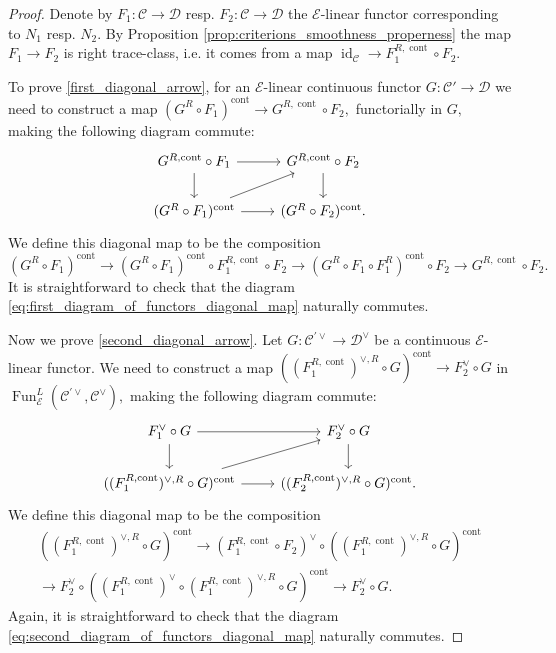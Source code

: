 \documentclass[11pt,leqno]{amsart}
\numberwithin{equation}{section}
\newcommand{\cont}{\operatorname{cont}}
\newcommand{\cD}{{\mathcal D}}
\newcommand{\cC}{{\mathcal C}}
\newcommand{\cE}{{\mathcal E}}
\newcommand{\Fun}{\operatorname{Fun}}
\newcommand{\id}{\operatorname{id}}
\begin{document}
\begin{proof} 
Denote by $F_1:\cC\to\cD$ resp. $F_2:\cC\to\cD$ the $\cE$-linear functor corresponding to $N_1$ resp. $N_2.$ By Proposition \ref{prop:criterions_smoothness_properness} the map $F_1\to F_2$ is right trace-class, i.e. it comes from a map $\id_{\cC}\to F_1^{R,\cont}\circ F_2$. 

To prove \ref{first_diagonal_arrow}, for an $\cE$-linear continuous functor $G:\cC'\to\cD$ we need to construct a map $(G^R\circ F_1)^{\cont}\to G^{R,\cont}\circ F_2,$ functorially in $G,$ making the following diagram commute:
\begin{equation}\label{eq:first_diagram_of_functors_diagonal_map}
\begin{tikzcd}
G^{R,\cont}\circ F_1\ar[d]\ar[r] & G^{R,\cont}\circ F_2 \ar[d]\\
(G^R\circ F_1)^{\cont}\ar[r]\ar[ru] & (G^R\circ F_2)^{\cont}.
\end{tikzcd}	
\end{equation}
We define this diagonal map to be the composition
\begin{equation*}
(G^R\circ F_1)^{\cont}\to (G^R\circ F_1)^{\cont}\circ F_1^{R,\cont}\circ F_2\to (G^R\circ F_1\circ F_1^R)^{\cont}\circ F_2\to G^{R,\cont}\circ F_2.
\end{equation*}
It is straightforward to check that the diagram \eqref{eq:first_diagram_of_functors_diagonal_map} naturally commutes.

Now we prove \ref{second_diagonal_arrow}. Let $G:\cC^{'\vee}\to\cD^{\vee}$ be a continuous $\cE$-linear functor. We need to construct a map $((F_1^{R,\cont})^{\vee,R}\circ G)^{\cont}\to F_2^{\vee}\circ G$ in $\Fun_{\cE}^L(\cC^{'\vee},\cC^{\vee}),$ making the following diagram commute: 
\begin{equation}\label{eq:second_diagram_of_functors_diagonal_map}
\begin{tikzcd}
	F_1^{\vee}\circ G\ar[d]\ar[r] & F_2^{\vee}\circ G \ar[d]\\
	((F_1^{R,\cont})^{\vee,R}\circ G)^{\cont}\ar[r]\ar[ru] & ((F_2^{R,\cont})^{\vee,R}\circ G)^{\cont}.
\end{tikzcd}	
\end{equation}
We define this diagonal map to be the composition
\begin{multline*}
((F_1^{R,\cont})^{\vee,R}\circ G)^{\cont}\to (F_1^{R,\cont}\circ F_2)^{\vee}\circ ((F_1^{R,\cont})^{\vee,R}\circ G)^{\cont}\\
\to F_2^{\vee}\circ ((F_1^{R,\cont})^{\vee}\circ (F_1^{R,\cont})^{\vee,R}\circ G)^{\cont}\to F_2^{\vee}\circ G.
\end{multline*}
Again, it is straightforward to check that the diagram \eqref{eq:second_diagram_of_functors_diagonal_map} naturally commutes. 
\end{proof}
\end{document}
